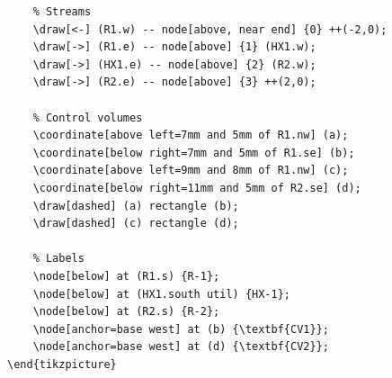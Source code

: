 \documentclass[11pt]{article}
\begin{document}
\begin{enumerate}[resume*]
\begin{lstlisting}
	% Streams
	\draw[<-] (R1.w) -- node[above, near end] {0} ++(-2,0);
	\draw[->] (R1.e) -- node[above] {1} (HX1.w);
	\draw[->] (HX1.e) -- node[above] {2} (R2.w);
	\draw[->] (R2.e) -- node[above] {3} ++(2,0);
	
	% Control volumes
	\coordinate[above left=7mm and 5mm of R1.nw] (a);
	\coordinate[below right=7mm and 5mm of R1.se] (b);
	\coordinate[above left=9mm and 8mm of R1.nw] (c);
	\coordinate[below right=11mm and 5mm of R2.se] (d);
	\draw[dashed] (a) rectangle (b);
	\draw[dashed] (c) rectangle (d);	
	
	% Labels
	\node[below] at (R1.s) {R-1};
	\node[below] at (HX1.south util) {HX-1};
	\node[below] at (R2.s) {R-2};
	\node[anchor=base west] at (b) {\textbf{CV1}};
	\node[anchor=base west] at (d) {\textbf{CV2}};
\end{tikzpicture}
	\end{lstlisting}
\end{enumerate}
\end{document}
